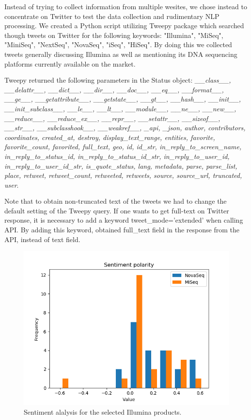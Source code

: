 \documentclass[10pt]{IEEEtran}
\begin{document}
Instead of trying to collect information from multiple wesites, we chose instead to concentrate on Twitter to test the data collection and rudimentary NLP processing. We created a Python script utilizing Tweepy package which searched though tweets on Twitter for the following keywords: "Illumina", "MiSeq", "MiniSeq", "NextSeq", "NovaSeq", "iSeq", "HiSeq". By doing this we collected tweets generally discussing Illumina as well as mentioning its DNA sequencing platforms currently available on the market. 

Tweepy returned the following parameters in the Status object: \textit{ 
 \_\_class\_\_,  \_\_delattr\_\_,  \_\_dict\_\_,  \_\_dir\_\_,  \_\_doc\_\_,  \_\_eq\_\_,  \_\_format\_\_, 
 \_\_ge\_\_,  \_\_getattribute\_\_,  \_\_getstate\_\_,  \_\_gt\_\_,  \_\_hash\_\_,  \_\_init\_\_,
 \_\_init\_subclass\_\_,  \_\_le\_\_,  \_\_lt\_\_,  \_\_module\_\_,  \_\_ne\_\_,  \_\_new\_\_,
 \_\_reduce\_\_,  \_\_reduce\_ex\_\_,  \_\_repr\_\_,  \_\_setattr\_\_,  \_\_sizeof\_\_,  \_\_str\_\_,
 \_\_subclasshook\_\_,  \_\_weakref\_\_,  \_api,  \_json,  author,  contributors,  coordinates,
 created\_at,  destroy,  display\_text\_range,  entities,  favorite,  favorite\_count,  favorited,
 full\_text,  geo,  id,  id\_str,  in\_reply\_to\_screen\_name,  in\_reply\_to\_status\_id,
 in\_reply\_to\_status\_id\_str,  in\_reply\_to\_user\_id,  in\_reply\_to\_user\_id\_str,
 is\_quote\_status,  lang,  metadata,  parse,  parse\_list,  place,  retweet,  retweet\_count,
 retweeted,  retweets,  source,  source\_url,  truncated,  user}.

Note that to obtain non-truncated text of the tweets we had to change the default setting of the Tweepy query. If one wants to get full-text on Twitter response, it is necessary to add a keyword tweet\_mode='extended' when calling API. By adding this keyword, obtained full\_text field in the response from the API, instead of text field.

\begin{figure} 
\centering
\includegraphics[width=5.5in]{sentiment.png} 
\caption{Sentiment alalysis for the selected Illumina products.}
\label{sentiment} 
\end{figure}
\end{document}
